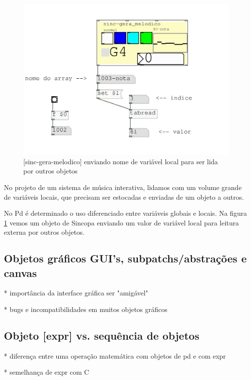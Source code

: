 \documentclass{ppgmus}
\begin{document}
\begin{figure}[!htt]
\includegraphics[scale=.6]{ex-variaveis}
\caption{[sinc-gera-melodico] enviando nome de variável local para ser lida por outros objetos}
\label{ex-variaveis}
\end{figure}

No projeto de um sistema de música interativa, lidamos com um volume grande
de variáveis locais, que precisam ser estocadas e enviadas de um objeto a outros.

No Pd é determinado o uso diferenciado entre variáveis globais e locais.
Na figura \ref{ex-variaveis} vemos um objeto de Sincopa enviando um valor de 
variável local para leitura externa por outros objetos.




\subsection{Objetos gráficos GUI's, subpatchs/abstrações e canvas}


* importância da interface gráfica ser "amigável"

* bugs e incompatibilidades em muitos objetos gráficos



\subsection{Objeto [expr] vs. sequência de objetos}

* diferença entre uma operação matemática com objetos de pd e com expr

* semelhança de expr com C
\end{document}
